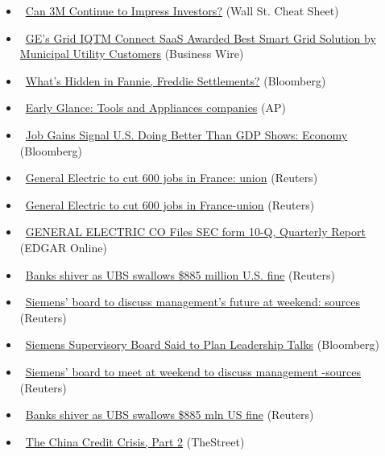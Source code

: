 \documentclass[11pt,asymmetric]{article}
\begin{document}
\begin{itemize}
\item\ \href{http://wallstcheatsheet.com/stocks/can-3m-continue-to-impress-investors.html/?ref=YF}{Can 3M Continue to Impress Investors?} (Wall St. Cheat Sheet)
\item\ \href{http://finance.yahoo.com/news/ge-grid-iqtm-connect-saas-154900077.html}{GE’s Grid IQTM Connect SaaS Awarded Best Smart Grid Solution by Municipal Utility Customers} (Business Wire)
\item\ \href{http://www.bloomberg.com/news/2013-07-26/what-s-hidden-in-fannie-freddie-settlements-.html?cmpid=yhoo}{What's Hidden in Fannie, Freddie Settlements?} (Bloomberg)
\item\ \href{http://finance.yahoo.com/news/early-glance-tools-appliances-companies-153308594.html}{Early Glance: Tools and Appliances companies} (AP)
\item\ \href{http://www.bloomberg.com/news/2013-07-26/job-gains-signal-u-s-doing-better-than-gdp-shows-economy-1-.html?cmpid=yhoo}{Job Gains Signal U.S. Doing Better Than GDP Shows: Economy} (Bloomberg)
\item\ \href{http://finance.yahoo.com/news/general-electric-cut-600-jobs-124837551.html}{General Electric to cut 600 jobs in France: union} (Reuters)
\item\ \href{http://www.reuters.com/article/2013/07/26/generalelectric-jobs-france-idUSL6N0FW2QD20130726?feedType=RSS&feedName=marketsNews&rpc=43}{General Electric to cut 600 jobs in France-union} (Reuters)
\item\ \href{http://biz.yahoo.com/e/130726/ge10-q.html}{GENERAL ELECTRIC CO Files SEC form 10-Q, Quarterly Report} (EDGAR Online)
\item\ \href{http://finance.yahoo.com/news/banks-shiver-ubs-swallows-885-103217573.html}{Banks shiver as UBS swallows \$885 million U.S. fine} (Reuters)
\item\ \href{http://finance.yahoo.com/news/siemens-board-members-discuss-future-113200187.html}{Siemens' board to discuss management's future at weekend: sources} (Reuters)
\item\ \href{http://www.bloomberg.com/news/2013-07-26/siemens-supervisory-board-said-to-plan-leadership-talks-1-.html?cmpid=yhoo}{Siemens Supervisory Board Said to Plan Leadership Talks} (Bloomberg)
\item\ \href{http://www.reuters.com/article/2013/07/26/siemens-management-idUSL6N0FW29E20130726?feedType=RSS&feedName=industrialsSector&rpc=43}{Siemens' board to meet at weekend to discuss management -sources} (Reuters)
\item\ \href{http://www.reuters.com/article/2013/07/26/usa-ubs-settlement-idUSL1N0FV2F820130726?feedType=RSS&feedName=rbssFinancialServicesAndRealEstateNews&rpc=43}{Banks shiver as UBS swallows \$885 mln US fine} (Reuters)
\item\ \href{http://www.thestreet.com/story/11990443/1/the-china-credit-crisis-part-2.html?puc=yahoo&cm_ven=YAHOO}{The China Credit Crisis, Part 2} (TheStreet)
\end{itemize}
\end{document}

